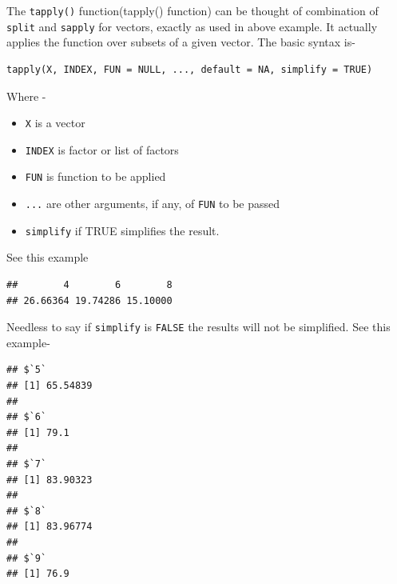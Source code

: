 \documentclass[
]{book}
\newenvironment{Shaded}{\begin{snugshade}}{\end{snugshade}}
\newcommand{\AttributeTok}[1]{\textcolor[rgb]{0.13,0.29,0.53}{#1}}
\newcommand{\CommentTok}[1]{\textcolor[rgb]{0.56,0.35,0.01}{\textit{#1}}}
\newcommand{\ConstantTok}[1]{\textcolor[rgb]{0.56,0.35,0.01}{#1}}
\newcommand{\FunctionTok}[1]{\textcolor[rgb]{0.13,0.29,0.53}{\textbf{#1}}}
\newcommand{\NormalTok}[1]{#1}
\newcommand{\SpecialCharTok}[1]{\textcolor[rgb]{0.81,0.36,0.00}{\textbf{#1}}}
\providecommand{\tightlist}{%
  \setlength{\itemsep}{0pt}\setlength{\parskip}{0pt}}
\begin{document}
The \texttt{tapply()} function\index(tapply() function) can be thought of combination of \texttt{split} and \texttt{sapply} for vectors, exactly as used in above example. It actually applies the function over subsets of a given vector. The basic syntax is-

\begin{verbatim}
tapply(X, INDEX, FUN = NULL, ..., default = NA, simplify = TRUE)
\end{verbatim}

Where -

\begin{itemize}
\tightlist
\item
  \texttt{X} is a vector
\item
  \texttt{INDEX} is factor or list of factors
\item
  \texttt{FUN} is function to be applied
\item
  \texttt{...} are other arguments, if any, of \texttt{FUN} to be passed
\item
  \texttt{simplify} if TRUE simplifies the result.
\end{itemize}

See this example

\begin{Shaded}
\end{Shaded}

\begin{verbatim}
##        4        6        8 
## 26.66364 19.74286 15.10000
\end{verbatim}

Needless to say if \texttt{simplify} is \texttt{FALSE} the results will not be simplified. See this example-

\begin{Shaded}
\end{Shaded}

\begin{verbatim}
## $`5`
## [1] 65.54839
## 
## $`6`
## [1] 79.1
## 
## $`7`
## [1] 83.90323
## 
## $`8`
## [1] 83.96774
## 
## $`9`
## [1] 76.9
\end{verbatim}
\end{document}
